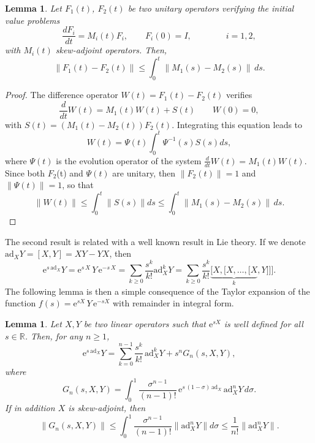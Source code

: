 \documentclass[11pt]{article}
\newcommand{\e}{\ensuremath{\mathrm{e}}}
\newcommand{\ad}{\ensuremath{\mathrm{ad}}}
\newtheorem{lemma}[theorem]{Lemma}
\begin{document}
\begin{lemma} \label{lemma_estimate}
Let $F_1(t)$, $F_2(t)$ be two unitary operators verifying the initial value problems
\begin{equation} \label{ivp_2op}
   \frac{d F_i}{dt} = M_i(t) F_i, \qquad F_i(0) = I, \qquad\qquad i=1,2,
\end{equation}
with $M_i(t)$ skew-adjoint operators. Then,
\[
\|F_1(t) - F_2(t)\| \leq 
\int_0^t \| M_1(s) - M_2(s)\| \, ds.
\]
\end{lemma}  

\begin{proof}
The difference operator $W(t)=F_1(t) - F_2(t)$ verifies
\[
  \frac{d }{dt} W(t) = M_1(t) W(t) + S(t) \qquad W(0) = 0,
\]
with $S(t) = (M_1(t) - M_2(t)) F_2(t) $. Integrating this equation leads to
\[
  W(t) = \Psi(t) \int_0^t \Psi^{-1}(s) S(s) ds,
\]
where $\Psi(t)$ is the evolution operator of the system $\frac{d }{dt} W(t) = M_1(t) W(t)$. Since both $F_2$(t) and $\Psi(t)$ are unitary, then 
$\|F_2(t)\| = 1$ and $\| \Psi(t)\| = 1$, so that
\[
  \|W(t)\| \le \int_0^t \|S(s)\| ds \le \int_0^t \| M_1(s) - M_2(s)\| \, ds.
\]  
\end{proof}  
The second result is related with a well known result in Lie theory. If we denote $\ad_X Y = [X,Y] = X Y  - Y X$, then
\begin{equation} \label{exp_ad}
  \e^{s \, \ad_{X}} Y = \e^{s \,  X} \, Y \, \e^{-s \,  X}  = \sum_{k \ge 0} \frac{s^k }{k!} \ad_X^k Y = \sum_{k \ge 0} \frac{s^k }{k!}
 \underbrace{[X, [X, \ldots, [X}_{k}, Y]]].
\end{equation}
The following 
lemma  is then a simple consequence of the Taylor expansion of the function $f(s) = \e^{s X} \, Y \, \e^{-s X}$
with remainder in integral form.
\begin{lemma} \label{l:lemma2}
    Let $X, Y$ be two linear operators such that $\e^{s X}$ is well defined for all $s \in \mathbb R$. Then, for any $n\geq 1$, 
        \[
        \e^{s \, \ad_X} Y = \sum_{k=0}^{n-1} \frac{s^k}{k!} \, \ad_X^{k} Y + s^n G_n\left(s, X, Y\right),
    \]
    where
  \begin{equation}
  \label{eq:Gn}
G_n(s, X,Y) = \int_0^1 \frac{\sigma^{n-1}}{(n-1)!} \, \e^{s \, (1-\sigma)\, \ad_X}\, \ad_X^n Y\, d\sigma.
\end{equation}
If in addition $X$ is skew-adjoint, then
\begin{equation} \label{norm_G}
  \|G_n(s,X,Y)\| \le \int_0^1 \frac{\sigma^{n-1}}{(n-1)!} \|\ad_X^n Y\| d\sigma \le \frac{1}{n!} \|\ad_X^n Y\|.
\end{equation}

\end{lemma}
\end{document}
